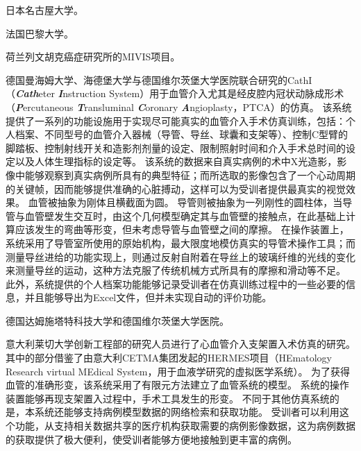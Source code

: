 日本名古屋大学\cite{Arai1996Nagoya}\cite{Ikeda2005Nagoya}。

法国巴黎大学\cite{Ghembaza2004ParisU}。

荷兰列文胡克癌症研究所的MIVIS项目\cite{Konings2003NKI}\cite{alderliesten2002NKI}\cite{alderliesten2004NKI}\cite{alderliesten2007NKI}\cite{alderliesten2007aNKI}\cite{Bosman2005NKI}。

德国曼海姆大学、海德堡大学与德国维尔茨堡大学医院联合研究的CathI（\textbf{\textit{Cath}}eter \textbf{\textit{I}}nstruction System）用于血管介入尤其是经皮腔内冠状动脉成形术（\textbf{\textit{P}}ercutaneous \textbf{\textit{T}}ransluminal \textbf{\textit{C}}oronary \textbf{\textit{A}}ngioplasty，PTCA）的仿真\cite{rebholz2004cathi}\cite{Hoefer2002CathI}。
该系统提供了一系列的功能设施用于实现尽可能真实的血管介入手术仿真训练\cite{rebholz2004cathi}，包括：个人档案、不同型号的血管介入器械（导管、导丝、球囊和支架等）、控制C型臂的脚踏板、控制射线开关和造影剂剂量的设定、限制照射时间和介入手术总时间的设定以及人体生理指标的设定等。
该系统的数据来自真实病例的术中X光造影，影像中能够观察到真实病例所具有的典型特征；而所选取的影像包含了一个心动周期的关键帧，因而能够提供准确的心脏搏动，这样可以为受训者提供最真实的视觉效果。
血管被抽象为刚体且横截面为圆\cite{Hoefer2002CathI}。
导管则被抽象为一列刚性的圆柱体，当导管与血管壁发生交互时，由这个几何模型确定其与血管壁的接触点，在此基础上计算应该发生的弯曲等形变，但未考虑导管与血管壁之间的摩擦\cite{rebholz2004cathi}。
在操作装置上，系统采用了导管室所使用的原始机构，最大限度地模仿真实的导管术操作工具；而测量导丝进给的功能实现上，则通过反射自附着在导丝上的玻璃纤维的光线的变化来测量导丝的运动，这种方法克服了传统机械方式所具有的摩擦和滑动等不足\cite{Hoefer2002CathI}。
此外，系统提供的个人档案功能能够记录受训者在仿真训练过程中的一些必要的信息，并且能够导出为Excel文件，但并未实现自动的评价功能\cite{rebholz2004cathi}。

德国达姆施塔特科技大学和德国维尔茨堡大学医院\cite{Rahman2012}。

意大利莱切大学创新工程部的研究人员进行了心血管介入支架置入术仿真的研究\cite{aloisio2006HERMES}\cite{aloisio2006aHERMES}\cite{aloisio2005HERMES}\cite{aloisio2004HERMES}。
其中的部分借鉴了由意大利CETMA集团发起的HERMES项目（HEmatology Research virtual MEdical System，用于血液学研究的虚拟医学系统）\cite{aloisio2005HERMES}。
为了获得血管的准确形变，该系统采用了有限元方法建立了血管系统的模型\cite{aloisio2004HERMES}。
系统的操作装置能够再现支架置入过程中，手术工具发生的形变\cite{aloisio2005HERMES}。
不同于其他仿真系统的是，本系统还能够支持病例模型数据的网络检索和获取功能\cite{aloisio2006aHERMES}\cite{aloisio2006HERMES}。
受训者可以利用这个功能，从支持相关数据共享的医疗机构获取需要的病例影像数据，这为病例数据的获取提供了极大便利，使受训者能够方便地接触到更丰富的病例。

